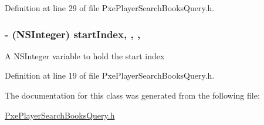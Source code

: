 Definition at line 29 of file Pxe\-Player\-Search\-Books\-Query.\-h.

\hypertarget{interface_pxe_player_search_books_query_a860b999ef5a591e01872705e09ed871f}{
\subsubsection[{start\-Index}]{\setlength{\rightskip}{0pt plus 5cm}-\/ (N\-S\-Integer) start\-Index\hspace{0.3cm}{\ttfamily [read]}, {\ttfamily [write]}, {\ttfamily [nonatomic]}, {\ttfamily [assign]}}}\label{interface_pxe_player_search_books_query_a860b999ef5a591e01872705e09ed871f}
A N\-S\-Integer variable to hold the start index 

Definition at line 19 of file Pxe\-Player\-Search\-Books\-Query.\-h.



The documentation for this class was generated from the following file\-:\begin{DoxyCompactItemize}
\item 
\hyperlink{_pxe_player_search_books_query_8h}{Pxe\-Player\-Search\-Books\-Query.\-h}\end{DoxyCompactItemize}
